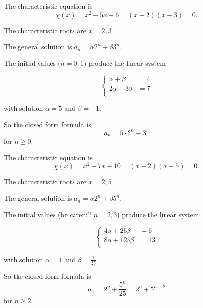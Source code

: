 \begin{Solution}{36.3}

The characteristic equation is 
\[
\chi(x) = x^{2} - 5x +6 = (x-2)(x-3) =0.
\] 

The characteristic roots are $x = 2, 3$.

The general solution is $a_{n}=\alpha 2^{n} + \beta3^{n}$.

The initial values ($n = 0,1$)  produce the linear system

\[
  \left\{
    \begin{aligned}
     \alpha + \beta &= 4\\
     2\alpha + 3\beta &= 7\\
     \end{aligned}
   \right.
\]
   
with solution $\alpha = 5$ and $\beta = -1$.

So the closed form formula is 
\[
a_{n} = 5\cdot2^{n} -3^{n}
\]   
for $n\geq 0$.


\end{Solution}

\begin{Solution}{36.4}

The characteristic equation is 
\[
\chi(x) = x^{2} - 7x +10 = (x-2)(x-5) =0.
\] 

The characteristic roots are $x = 2, 5$.

The general solution is $a_{n}=\alpha 2^{n} + \beta5^{n}$.

The initial values (be careful! $n = 2,3$)  produce the linear system

\[
  \left\{
    \begin{aligned}
     4\alpha + 25\beta &= 5\\
     8\alpha + 125\beta &= 13\\
     \end{aligned}
   \right.
\]
   
with solution $\alpha = 1$ and $\beta = \frac{1}{25}$.

So the closed form formula is 
\[
a_{n} = 2^{n} +\frac{5^{n}}{25} = 2^{n} +5^{n-2}
\]   
for $n\geq 2$.

\end{Solution}

